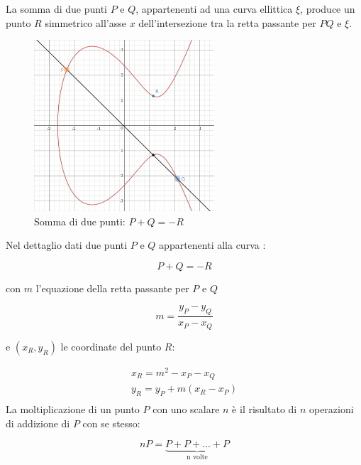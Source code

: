 La somma di due punti $P$ e $Q$, appartenenti ad una curva ellittica $\xi$, produce un punto $R$ simmetrico all'asse $x$ dell'intersezione tra la retta passante per $PQ$ e $\xi$.
\begin{figure}[H]
    \centering
    \includegraphics[width=0.6\textwidth]{images/ECDSA.png}
    \caption{Somma di due punti: $P+Q=-R$}
    \label{fig:ECDSA}
\end{figure}
Nel dettaglio dati due punti $P$ e $Q$ appartenenti alla curva \xi:

\begin{equation}
    P + Q = -R
\end{equation}

con $m$ l'equazione della retta passante per $P$ e $Q$

\begin{equation}
    m=\frac{y_P-y_Q}{x_P-x_Q}
\end{equation}

e $(x_R,y_R)$ le coordinate del punto $R$:

\begin{equation}
    \begin{split}
        x_R = m^2 - x_P - x_Q\\
        y_R = y_P + m(x_R - x_P)\\
    \end{split}
\end{equation}
La moltiplicazione di un punto $P$ con uno scalare $n$ è il risultato di $n$ operazioni di addizione di $P$ con se stesso:

\begin{equation}
    nP = \underbrace{P + P + ... + P}_\text{n volte}
\end{equation}

